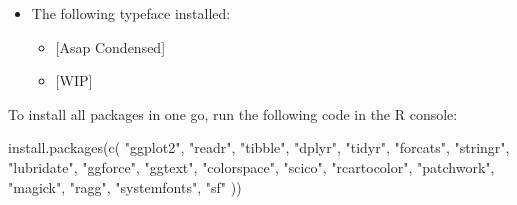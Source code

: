 \documentclass[
]{krantz}
\makeatletter
\newenvironment{Shaded}{\begin{snugshade}}{\end{snugshade}}
\newcommand{\FunctionTok}[1]{\textcolor[rgb]{0,0,0}{#1}}
\newcommand{\NormalTok}[1]{#1}
\newcommand{\StringTok}[1]{\textcolor[rgb]{0.5,0.5,0.5}{#1}}
\providecommand{\tightlist}{%
  \setlength{\itemsep}{0pt}\setlength{\parskip}{0pt}}
\renewcommand{\href}[2]{#2\footnote{\url{#1}}}
\newenvironment{kframe}{%
\medskip{}
\setlength{\fboxsep}{.8em}
 \def\at@end@of@kframe{}%
 \ifinner\ifhmode%
  \def\at@end@of@kframe{\end{minipage}}%
  \begin{minipage}{\columnwidth}%
 \fi\fi%
 \def\FrameCommand##1{\hskip\@totalleftmargin \hskip-\fboxsep
 \colorbox{shadecolor}{##1}\hskip-\fboxsep
     \hskip-\linewidth \hskip-\@totalleftmargin \hskip\columnwidth}%
 \MakeFramed {\advance\hsize-\width
   \@totalleftmargin\z@ \linewidth\hsize
   \@setminipage}}%
 {\par\unskip\endMakeFramed%
 \at@end@of@kframe}
\renewenvironment{Shaded}{\begin{kframe}}{\end{kframe}}
\makeatother
\begin{document}
\begin{itemize}
\begin{itemize}
    \begin{itemize}
    \tightlist
    \item
      \href{https://colorspace.r-forge.r-project.org/}{\textbf{colorspace}}
    \item
      \href{https://github.com/thomasp85/scico}{\textbf{scico}}
    \item
      \href{https://jakubnowosad.com/rcartocolor/}{\textbf{rcartocolor}}
    \end{itemize}
  \item
    A few other packages providing useful functionality:

    \begin{itemize}
    \tightlist
    \item
      \href{https://docs.ropensci.org/magick/}{\textbf{magick}}
    \item
      \href{https://ragg.r-lib.org/}{\textbf{ragg}} that includes \href{https://systemfonts.r-lib.org/}{\textbf{systemfonts}}
    \item
      \href{https://r-spatial.github.io/sf/}{\textbf{sf}}
    \end{itemize}
  \end{itemize}
\item
  The following typeface installed:

  \begin{itemize}
  \tightlist
  \item
    {[}Asap Condensed{]}
  \item
    {[}WIP{]}
  \end{itemize}
\end{itemize}

To install all packages in one go, run the following code in the R console:

\begin{Shaded}
\begin{Highlighting}[]
\FunctionTok{install.packages}\NormalTok{(}\FunctionTok{c}\NormalTok{(}
  \StringTok{"ggplot2"}\NormalTok{, }\StringTok{"readr"}\NormalTok{, }\StringTok{"tibble"}\NormalTok{, }\StringTok{"dplyr"}\NormalTok{, }\StringTok{"tidyr"}\NormalTok{, }\StringTok{"forcats"}\NormalTok{, }\StringTok{"stringr"}\NormalTok{, }\StringTok{"lubridate"}\NormalTok{, }\StringTok{"ggforce"}\NormalTok{, }\StringTok{"ggtext"}\NormalTok{, }\StringTok{"colorspace"}\NormalTok{, }\StringTok{"scico"}\NormalTok{, }\StringTok{"rcartocolor"}\NormalTok{, }\StringTok{"patchwork"}\NormalTok{, }\StringTok{"magick"}\NormalTok{, }\StringTok{"ragg"}\NormalTok{, }\StringTok{"systemfonts"}\NormalTok{, }\StringTok{"sf"}
\NormalTok{))}
\end{Highlighting}
\end{Shaded}
\end{document}
